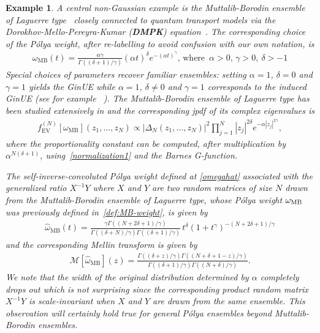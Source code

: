 \documentclass[pdflatex,sn-mathphys-num]{sn-jnl}
\theoremstyle{thmstyleone}
\newtheorem{example}[theorem]{Example}
\numberwithin{equation}{section}
\begin{document}
\begin{example}\label{ex:muttalib-borodin}
A central non-Gaussian example is the Muttalib-Borodin ensemble of Laguerre type~\cite{borodinBiorthogonalEnsembles1998} closely connected to quantum transport models via the Dorokhov-Mello-Pereyra-Kumar (\textbf{DMPK}) equation~\cite{dorokhovTransmissionCoefficientLocalization1982, melloMacroscopicApproachMultichannel1988}. The corresponding choice of the P\'olya weight, after re-labelling to avoid confusion with our own notation, is
\begin{align}\label{def:MB-weight}
    \omega_{\mathrm{MB}}\left(t\right)=\frac{\alpha\gamma}{\Gamma((\delta+1)/\gamma)}(\alpha t)^{\delta}e^{-(\alpha t)^{\gamma}},\,\text{where }\,\alpha>0,\,\gamma>0,\ \delta>-1
\end{align}
Special choices of parameters recover familiar ensembles: setting $\alpha=1$, $\delta=0$ and $\gamma=1$ yields the GinUE while $\alpha=1$, $\delta\neq 0$ and $\gamma=1$ corresponds to the induced GinUE (see for example ~\cite{fischmannInducedGinibreEnsemble2012}).
The Muttalib-Borodin ensemble of Laguerre type has been studied extensively in \cite[Sec.~4]{borodinBiorthogonalEnsembles1998} and the corresponding  jpdf of its complex eigenvalues is
\begin{align}\label{muttalibborodinev}
   f^{\left ( N \right )}_{\mathrm{EV}}\left [ \omega_{\mathrm{MB}} \right ]\left(z_{1},\ldots,z_{N}\right)\propto |\Delta_{N}\left( z_{1},\ldots,z_{N} \right)|^2\prod\limits_{j=1}^{N}|z_{j}|^{2\delta}e^{-\alpha |z_{j}|^{2\gamma}},
\end{align}
where the proportionality constant can be computed, after multiplication by $\alpha^{N(\delta+1)}$, using~\eqref{normalization1} and the Barnes G-function.

 
The self-inverse-convoluted P\'olya weight defined at \eqref{omegahat} associated with the generalized ratio $X^{-1}Y$ where $X$ and $Y$ are two random matrices of size $N$ drawn from the Muttalib-Borodin ensemble of Laguerre type, whose P\'olya weight $\omega_{\rm{MB}}$ was previously defined in~\eqref{def:MB-weight}, is given by
\begin{align}\label{id:generalizedratioweight}
    \widehat{\omega}_{\mathrm{MB}}\left(t\right)=\frac{\gamma\Gamma\left( (N + 2\delta + 1)/\gamma \right)}{\Gamma((\delta+N)/\gamma)\Gamma((\delta+1)/\gamma)} \, t^{\delta} \left(1 + t^\gamma \right)^{ -(N+2\delta+1)/\gamma}
\end{align}
and the corresponding Mellin transform is given by
\begin{align}\label{Mellin-MBI}
    \mathcal{M}[\widehat{\omega}_{\mathrm{MB}}](z)=\frac{\Gamma((\delta+z)/\gamma)\Gamma((N+\delta+1-z)/\gamma)}{\Gamma((\delta+1)/\gamma)\Gamma((N+\delta)/\gamma)}.
\end{align}
We note that the width of the original distribution determined by $\alpha$ completely drops out which is not surprising since the corresponding product random matrix $X^{-1}Y$ is scale-invariant when $X$ and $Y$ are drawn from the same ensemble. This observation will certainly hold true for general P\'olya ensembles beyond Muttalib-Borodin ensembles.
\end{example}
\end{document}
